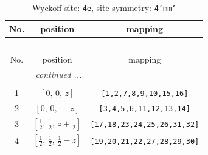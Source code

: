 \documentclass[fleqn,8pt]{jsarticle}
\begin{document}
\renewcommand{\arraystretch}{1.2}
\begin{longtable}{ccc}
\caption{Wyckoff site: {\tt 4e}, site symmetry: {\tt 4'mm'}}
 \\
 \hline \hline
No. & position & mapping \\ \hline \endfirsthead

\multicolumn{2}{l}{\tablename\ \thetable{}} \\
 \hline \hline
No. & position & mapping \\ \hline \endhead

 \hline \hline
\multicolumn{2}{r}{\footnotesize\it continued ...} \\ \endfoot

 \hline \hline
\multicolumn{2}{r}{} \\ \endlastfoot

1 & $\left[ 0,\, 0,\, z \right]$ & {\tt [1,2,7,8,9,10,15,16]} \\ \hline
2 & $\left[ 0,\, 0,\, - z \right]$ & {\tt [3,4,5,6,11,12,13,14]} \\ \hline
3 & $\left[ \frac{1}{2},\, \frac{1}{2},\, z + \frac{1}{2} \right]$ & {\tt [17,18,23,24,25,26,31,32]} \\ \hline
4 & $\left[ \frac{1}{2},\, \frac{1}{2},\, \frac{1}{2} - z \right]$ & {\tt [19,20,21,22,27,28,29,30]} \\
\end{longtable}
\renewcommand{\arraystretch}{1.2}
\end{document}
